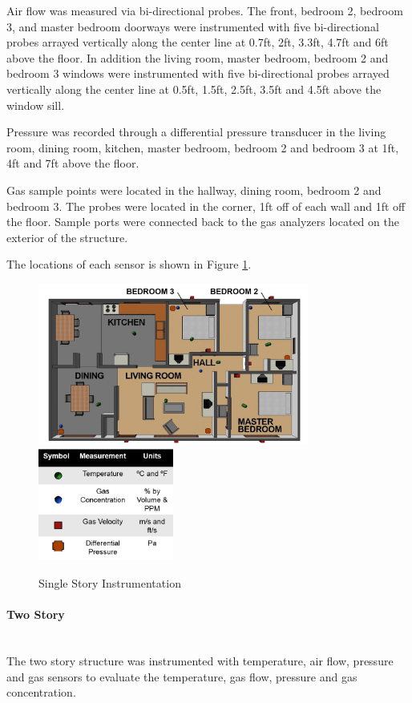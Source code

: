 \documentclass{article}
\begin{document}
Air flow was measured via bi-directional probes. The front, bedroom 2, bedroom 3, and master bedroom doorways were instrumented with five bi-directional probes arrayed vertically along the center line at 0.7ft, 2ft, 3.3ft, 4.7ft and 6ft above the floor. In addition the living room, master bedroom, bedroom 2 and bedroom 3 windows were instrumented with five bi-directional probes arrayed vertically along the center line at 0.5ft, 1.5ft, 2.5ft, 3.5ft and 4.5ft above the window sill. 

Pressure was recorded through a differential pressure transducer in the living room, dining room, kitchen, master bedroom, bedroom 2 and bedroom 3 at 1ft, 4ft and 7ft above the floor. 

Gas sample points were located in the hallway, dining room, bedroom 2 and bedroom 3. The probes were located in the corner, 1ft off of each wall and 1ft off the floor. Sample ports were connected back to the gas analyzers located on the exterior of the structure. 

The locations of each sensor is shown in Figure \ref{fig:SingleStoryInst}.

\begin{figure}[H]
	\centering
	\includegraphics[width = 3.5in]{0_Images/Instrumentation/Single_Story_Instrumentation.png}
	\includegraphics[width = 1.75in]{0_Images/Instrumentation/Single_Story_Instrumentation_Key2.png}
	\caption{Single Story Instrumentation}
	\label{fig:SingleStoryInst}
\end{figure}

\paragraph{Two Story} \mbox{}\\
The two story structure was instrumented with temperature, air flow, pressure and gas sensors to evaluate the temperature, gas flow, pressure and gas concentration. 
\end{document}
